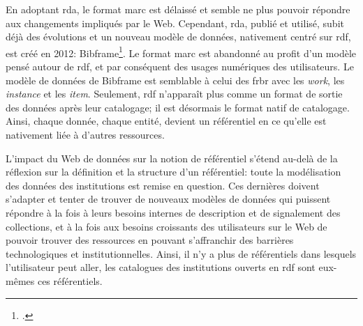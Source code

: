 En adoptant \ac{rda}, le format \ac{marc} est délaissé et semble ne plus pouvoir répondre aux changements impliqués par le Web. Cependant, \ac{rda}, publié et utilisé, subit déjà des évolutions et un nouveau modèle de données, nativement centré sur \ac{rdf}, est créé en 2012: Bibframe\footcite{library_of_congress_overview_2016}. Le format \ac{marc} est abandonné au profit d'un modèle pensé autour de \ac{rdf}, et par conséquent des usages numériques des utilisateurs. Le modèle de données de Bibframe est semblable à celui des \ac{frbr} avec les \textit{work}, les \textit{instance} et les \textit{item}. Seulement, \ac{rdf} n'apparaît plus comme un format de sortie des données après leur catalogage; il est désormais le format natif de catalogage. Ainsi, chaque donnée, chaque entité, devient un référentiel en ce qu'elle est nativement liée à d'autres ressources.

\bigskip
\bigskip
L'impact du Web de données sur la notion de référentiel s'étend au-delà de la réflexion sur la définition et la structure d'un référentiel: toute la modélisation des données des institutions est remise en question. Ces dernières doivent s'adapter et tenter de trouver de nouveaux modèles de données qui puissent répondre à la fois à leurs besoins internes de description et de signalement des collections, et à la fois aux besoins croissants des utilisateurs sur le Web de pouvoir trouver des ressources en pouvant s'affranchir des barrières technologiques et institutionnelles. Ainsi, il n'y a plus de référentiels dans lesquels l'utilisateur peut aller, les catalogues des institutions ouverts en \ac{rdf} sont eux-mêmes ces référentiels.